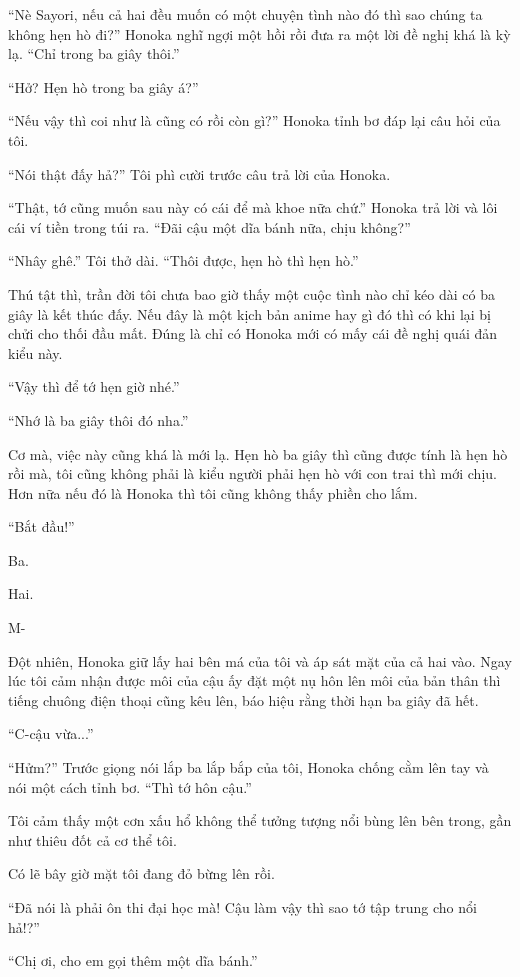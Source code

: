 {``Nè Sayori, nếu cả hai đều muốn có một chuyện tình nào đó thì sao chúng
ta không hẹn hò đi?'' Honoka nghĩ ngợi một hồi rồi đưa ra một lời đề
nghị khá là kỳ lạ. ``Chỉ trong ba giây thôi.''

``Hở? Hẹn hò trong ba giây á?''

``Nếu vậy thì coi như là cũng có rồi còn gì?'' Honoka tỉnh bơ đáp lại
câu hỏi của tôi.

``Nói thật đấy hả?'' Tôi phì cười trước câu trả lời của Honoka.

``Thật, tớ cũng muốn sau này có cái để mà khoe nữa chứ.'' Honoka trả lời
và lôi cái ví tiền trong túi ra. ``Đãi cậu một dĩa bánh nữa, chịu
không?''

``Nhây ghê.'' Tôi thở dài. ``Thôi được, hẹn hò thì hẹn hò.''

Thú tật thì, trần đời tôi chưa bao giờ thấy một cuộc tình nào chỉ kéo
dài có ba giây là kết thúc đấy. Nếu đây là một kịch bản anime hay gì đó
thì có khi lại bị chửi cho thối đầu mất. Đúng là chỉ có Honoka mới có
mấy cái đề nghị quái đản kiểu này.

``Vậy thì để tớ hẹn giờ nhé.''

``Nhớ là ba giây thôi đó nha.''

Cơ mà, việc này cũng khá là mới lạ. Hẹn hò ba giây thì cũng được tính là
hẹn hò rồi mà, tôi cũng không phải là kiểu người phải hẹn hò với con
trai thì mới chịu. Hơn nữa nếu đó là Honoka thì tôi cũng không thấy
phiền cho lắm.

``Bắt đầu!''

Ba.

Hai.

M-

Đột nhiên, Honoka giữ lấy hai bên má của tôi và áp sát mặt của cả hai
vào. Ngay lúc tôi cảm nhận được môi của cậu ấy đặt một nụ hôn lên môi
của bản thân thì tiếng chuông điện thoại cũng kêu lên, báo hiệu rằng
thời hạn ba giây đã hết.

``C-cậu vừa...''

``Hửm?'' Trước giọng nói lắp ba lắp bắp của tôi, Honoka chống cằm lên
tay và nói một cách tỉnh bơ. ``Thì tớ hôn cậu.''

Tôi cảm thấy một cơn xấu hổ không thể tưởng tượng nổi bùng lên bên
trong, gần như thiêu đốt cả cơ thể tôi.

Có lẽ bây giờ mặt tôi đang đỏ bừng lên rồi.

``Đã nói là phải ôn thi đại học mà! Cậu làm vậy thì sao tớ tập trung cho
nổi hả!?''

``Chị ơi, cho em gọi thêm một dĩa bánh.''

}
